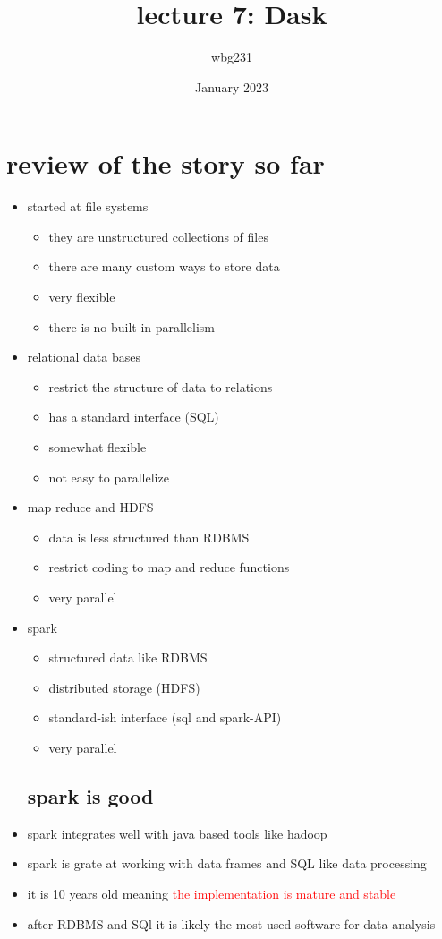 \documentclass{article}
\title{lecture 7: Dask }
\author{wbg231 }
\date{January 2023}
\begin{document}
\maketitle

\section{review of the story so far}
\begin{itemize}
\item started at file systems 
\begin{itemize}
    \item they are unstructured collections of files 
    \item there are many custom ways to store data 
    \item very flexible 
    \item there is no built in parallelism 
\end{itemize}
\item relational data bases 
\begin{itemize}
    \item restrict the structure of data to relations 
    \item has a standard interface (SQL)
    \item somewhat flexible
    \item not easy to parallelize 
\end{itemize}

\item map reduce and HDFS
\begin{itemize}
    \item data is less structured than RDBMS 
    \item restrict coding to map and reduce functions 
    \item very parallel 
\end{itemize}


\item spark
\begin{itemize}
    \item structured data like RDBMS
    \item distributed storage (HDFS)
    \item standard-ish interface (sql and spark-API)
    \item very parallel
\end{itemize}

\subsection*{spark is good}
\item spark integrates well with java based tools like hadoop
\item spark is grate at working with data frames and SQL like data processing 
\item it is 10 years old meaning \textcolor{red}{the implementation is mature and stable}
\item after RDBMS and SQl it is likely the most used software for data analysis

\end{itemize}
\end{document}
